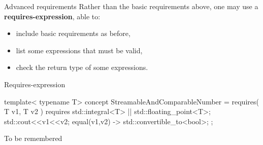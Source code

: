 \begin{frame}[fragile]
    \begin{block}{Advanced requirements}
        Rather than the basic requirements above, one may use a \textbf{requires-expression}, able to:
        \begin{itemize}
            \item include basic requirements as before,
            \item list some expressions that must be valid,
            \item check the return type of some expressions.
        \end{itemize}
    \end{block}
    \begin{exampleblock}{Requires-expression}
      \scriptsize
      \begin{cppcode*}{}
      template< typename T>
      concept StreamableAndComparableNumber = requires( T v1, T v2 )
       {
        requires std::integral<T> || std::floating_point<T>;
        std::cout<<v1<<v2;
        { equal(v1,v2) } -> std::convertible_to<bool>;
       };
      \end{cppcode*}
    \end{exampleblock}
\end{frame}

\begin{frame}[fragile]
    \begin{block}{To be remembered}
    \end{block}
\end{frame}
